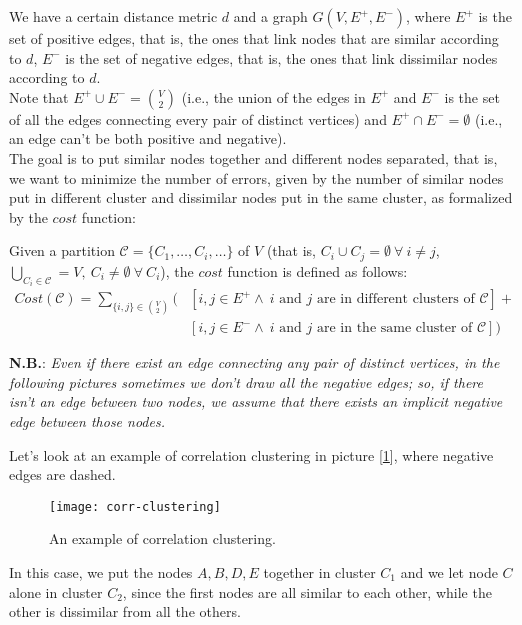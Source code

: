 We have a certain distance metric $d$ and a graph $G(V, E^+, E^-)$, where $E^+$ is the set of positive edges, that is, the ones that link nodes that are similar according to $d$, $E^-$ is the set of negative edges, that is, the ones that link dissimilar nodes according to $d$.\\
Note that $E^+ \cup E^- = \binom{V}{2}$ (i.e., the union of the edges in $E^+$ and $E^-$ is the set of all the edges connecting every pair of distinct vertices) and $E^+ \cap E^- = \emptyset$ (i.e., an edge can't be both positive and negative).\\
The goal is to put similar nodes together and different nodes separated, that is, we want to minimize the number of errors, given by the number of similar nodes put in different cluster and dissimilar nodes put in the same cluster, as formalized by the $cost$ function:

\begin{defn}[Cost]\label{def:clust-cost}
    Given a partition $\mathscr{C} = \{C_1, \ldots, C_i, \ldots\}$ of $V$ (that is, $C_i \cup C_j = \emptyset\ \forall\ i \neq j$, $\bigcup_{C_i \in \mathscr{C}} = V,\ C_i \neq \emptyset\ \forall\ C_i$), the $cost$ function is defined as follows:
    \begin{align}\label{eq:clust-cost}
        Cost(\mathscr{C}) = \sum_{\{i,j\} \in \binom{V}{2}} \bigl( &\left[ i,j \in E^+ \wedge\ i \text{ and } j \text{ are in different clusters of } \mathscr{C} \right] +\\
        &\left[ i,j \in E^- \wedge\ i \text{ and } j \text{ are in the same cluster of } \mathscr{C} \right] \bigr)\nonumber
    \end{align}
\end{defn}

\textbf{N.B.}: \textit{Even if there exist an edge connecting any pair of distinct vertices, in the following pictures sometimes we don't draw all the negative edges; so, if there isn't an edge between two nodes, we assume that there exists an implicit negative edge between those nodes.}

\begin{ex}
    Let's look at an example of correlation clustering in picture [\ref{fig:corr-clustering-ex}], where negative edges are dashed.
    
    \begin{figure}
        \centering
        \texttt{[image: corr-clustering]}
        \caption{An example of correlation clustering.}
        \label{fig:corr-clustering-ex}
    \end{figure}

    In this case, we put the nodes $A, B, D, E$ together in cluster $C_1$ and we let node $C$ alone in cluster $C_2$, since the first nodes are all similar to each other, while the other is dissimilar from all the others.
\end{ex}

